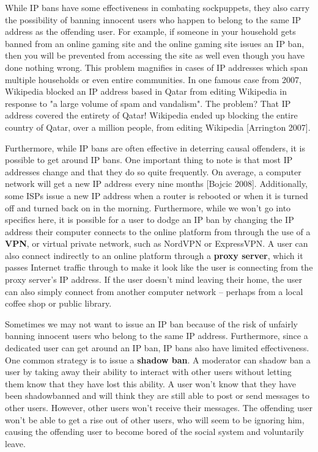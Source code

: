 \documentclass[class=book, crop=false]{standalone}
\providecommand{\keyterm}[1]{\textbf{#1}\marginnote{\scriptsize \textbf{#1}}}
\begin{document}
While IP bans have some effectiveness in combating sockpuppets, they also carry the possibility of banning innocent users who happen to belong to the same IP address as the offending user. For example, if someone in your household gets banned from an online gaming site and the online gaming site issues an IP ban, then you will be prevented from accessing the site as well even though you have done nothing wrong. This problem magnifies in cases of IP addresses which span multiple households or even entire communities. In one famous case from 2007, Wikipedia blocked an IP address based in Qatar from editing Wikipedia in response to "a large volume of spam and vandalism". The problem? That IP address covered the entirety of Qatar! Wikipedia ended up blocking the entire country of Qatar, over a million people, from editing Wikipedia [Arrington 2007].

Furthermore, while IP bans are often effective in deterring causal offenders, it is possible to get around IP bans. One important thing to note is that most IP addresses change and that they do so quite frequently. On average, a computer network will get a new IP address every nine months [Bojcic 2008]. Additionally, some ISPs issue a new IP address when a router is rebooted or when it is turned off and turned back on in the morning. Furthermore, while we won't go into specifics here, it is possible for a user to dodge an IP ban by changing the IP address their computer connects to the online platform from through the use of a \keyterm{VPN}, or virtual private network, such as NordVPN or ExpressVPN. A user can also connect indirectly to an online platform through a \keyterm{proxy server}, which it passes Internet traffic through to make it look like the user is connecting from the proxy server's IP address. If the user doesn't mind leaving their home, the user can also simply connect from another computer network -- perhaps from a local coffee shop or public library.

Sometimes we may not want to issue an IP ban because of the risk of unfairly banning innocent users who belong to the same IP address. Furthermore, since a dedicated user can get around an IP ban, IP bans also have limited effectiveness. One common strategy is to issue a \keyterm{shadow ban}. A moderator can shadow ban a user by taking away their ability to interact with other users without letting them know that they have lost this ability. A user won't know that they have been shadowbanned and will think they are still able to post or send messages to other users. However, other users won't receive their messages. The offending user won't be able to get a rise out of other users, who will seem to be ignoring him, causing the offending user to become bored of the social system and voluntarily leave.
\end{document}
